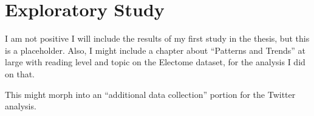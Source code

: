 \chapter{Exploratory Study}
I am not positive I will include the results of my first study in the thesis, but this is a placeholder. Also, I might include a chapter about ``Patterns and Trends'' at large with reading level and topic on the Electome dataset, for the analysis I did on that.

This might morph into an ``additional data collection'' portion for the Twitter analysis.








